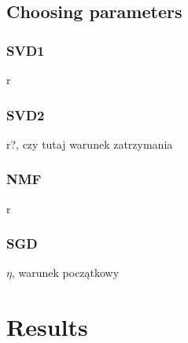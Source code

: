 \documentclass[11pt]{amsart}
\begin{document}
\subsection*{Choosing parameters}

\subsubsection*{SVD1} r

\subsubsection*{SVD2} r?, czy tutaj warunek zatrzymania

\subsubsection*{NMF} r

\subsubsection*{SGD} $\eta$, warunek początkowy

\section{Results}
\end{document}
